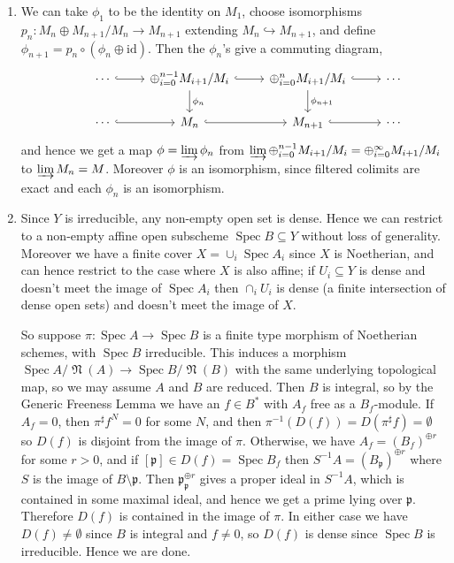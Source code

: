 \documentclass{report}
\newcommand{\id}{{\mathrm{id}}} %
\newcommand{\colimit}{\varinjlim} %
\newcommand{\p}{\mathfrak{p}}
\DeclareMathOperator{\Spec}{Spec}
\DeclareMathOperator{\nilrad}{\mathfrak{N}}
\begin{document}
\begin{enumerate}[label=\textbf{7.4.\Alph*.}]
	\item We can take $\phi_1$ to be the identity on $M_1$, choose
	      isomorphisms $p_n:M_n\oplus M_{n+1}/M_n\to M_{n+1}$ extending
	      $M_n\hookrightarrow M_{n+1}$, and define
	      $\phi_{n+1}=p_n\circ(\phi_n\oplus\id)$. Then the $\phi_n$'s give a
	      commuting diagram,
	      \begin{equation*}
		      \begin{tikzcd}
			      &\cdots \ar[r,hook]
			      &\oplus_{i=0}^{n-1}M_{i+1}/M_i \ar[r,hook] \ar[d,"\phi_n"]
			      &\oplus_{i=0}^{n}M_{i+1}/M_i \ar[r,hook] \ar[d,"\phi_{n+1}"]
			      &\cdots \\
			      &\cdots \ar[r,hook]
			      &M_n \ar[r,hook]
			      &M_{n+1} \ar[r,hook]
			      &\cdots
		      \end{tikzcd}
	      \end{equation*}
	      and hence we get a map $\phi=\colimit\phi_n$ from
	      $\colimit\oplus_{i=0}^{n-1}M_{i+1}/M_i=\oplus_{i=0}^\infty M_{i+1}/M_i$
	      to $\colimit M_n=M$. Moreover $\phi$ is an isomorphism, since filtered
	      colimits are exact and each $\phi_n$ is an isomorphism.

	\item Since $Y$ is irreducible, any non-empty open set is dense. Hence we
	      can restrict to a non-empty affine open subscheme $\Spec B\subseteq Y$
	      without loss of generality. Moreover we have a finite cover
	      $X=\cup_i\Spec A_i$ since $X$ is Noetherian, and can hence restrict to
	      the case where $X$ is also affine; if $U_i\subseteq Y$ is dense and
	      doesn't meet the image of $\Spec A_i$ then $\cap_iU_i$ is dense (a
	      finite intersection of dense open sets) and doesn't meet the image of
	      $X$.

	      So suppose $\pi:\Spec A\to\Spec B$ is a finite type morphism of
	      Noetherian schemes, with $\Spec B$ irreducible. This induces a
	      morphism $\Spec A/\nilrad(A)\to\Spec B/\nilrad(B)$ with the same
	      underlying topological map, so we may assume $A$ and $B$ are reduced.
	      Then $B$ is integral, so by the Generic Freeness Lemma we have an
	      $f\in B^*$ with $A_f$ free as a $B_f$-module. If $A_f=0$, then
	      $\pi^\sharp f^N=0$ for some $N$, and then
	      $\pi^{-1}(D(f))=D(\pi^\sharp f)=\emptyset$ so $D(f)$ is disjoint from
	      the image of $\pi$. Otherwise, we have $A_f=(B_f)^{\oplus r}$ for some
	      $r>0$, and if $[\p]\in D(f)=\Spec B_f$ then $S^{-1}A=(B_\p)^{\oplus r}$
	      where $S$ is the image of $B\setminus\p$. Then $\p_\p^{\oplus r}$
	      gives a proper ideal in $S^{-1}A$, which is contained in some maximal
	      ideal, and hence we get a prime lying over $\p$. Therefore $D(f)$ is
	      contained in the image of $\pi$. In either case we have
	      $D(f)\ne\emptyset$ since $B$ is integral and $f\ne0$, so $D(f)$ is
	      dense since $\Spec B$ is irreducible. Hence we are done.


\end{enumerate}
\end{document}

